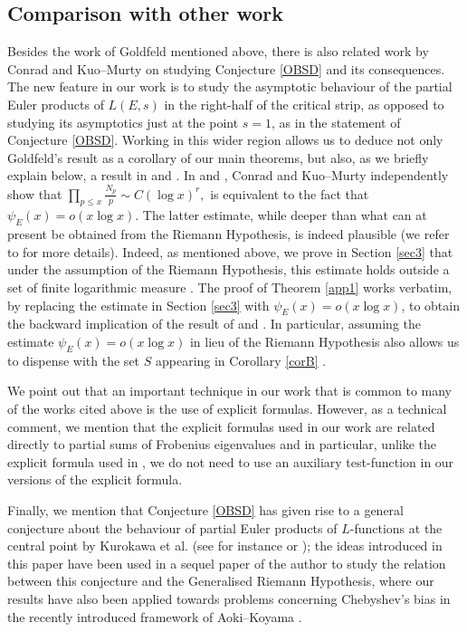 \documentclass[12pt,reqno]{amsart}
\theoremstyle{definition}
\numberwithin{equation}{section}
\begin{document}
\subsection{Comparison with other work} \label{comparison}
Besides the work of Goldfeld \cite{Goldfeld1982} mentioned above, there is also related work by Conrad \cite{Conrad2005} and Kuo--Murty \cite{KuoMurty2005} on studying Conjecture \ref{OBSD} and its consequences. 
The new feature in our work is to study the asymptotic behaviour of the partial Euler products of $L(E, s)$ in the right-half of the critical strip, as opposed to studying its asymptotics just at the point $s=1$, as in the statement of Conjecture \ref{OBSD}. Working in this wider region allows us to deduce not only Goldfeld's result as a corollary of our main theorems, but also, as we briefly explain below, a result in \cite{Conrad2005} and \cite{KuoMurty2005}.  In \cite{Conrad2005} and \cite{KuoMurty2005}, Conrad and Kuo--Murty independently show that $
\prod_{p \leq x} \frac{N_p}{p}  \sim C (\log x)^r, 
$  is equivalent to the fact that $\psi_E(x)=o(x \log x)$. The latter estimate, while deeper than what can at present be obtained from the Riemann Hypothesis, is indeed plausible (we refer to \cite[page 290]{Conrad2005} for more details). 
Indeed, as mentioned above, we prove in Section \ref{sec3} that under the assumption of the Riemann Hypothesis, this estimate holds outside a set of finite logarithmic measure . The proof of Theorem \ref{app1} works verbatim, by replacing the estimate in Section \ref{sec3} with $\psi_E(x)=o(x \log x)$, to obtain the backward implication of the result of \cite{Conrad2005} and \cite{KuoMurty2005}.  In particular, assuming the estimate $\psi_E(x)=o(x \log x)$ in lieu of the Riemann Hypothesis also allows us to dispense with the set $S$ appearing in Corollary \ref{corB} . 

We point out that an important technique in our work that is common to many of the works cited above is the use of explicit formulas. However, as a technical comment, we mention that the explicit formulas used in our work are related directly to partial sums of Frobenius eigenvalues and in particular, unlike the explicit formula used in \cite{Goldfeld1982},  we do not need to use an auxiliary test-function in our versions of the explicit formula. 

Finally, we mention that Conjecture \ref{OBSD} has given rise to a general conjecture about the behaviour of partial Euler products of $L$-functions at the central point by Kurokawa et al. (see for instance \cite{KimuraKoyamaKurokawa2014} or \cite{KanekoKoyamaKurokawa2022}); the ideas introduced in this paper have been used in a sequel paper of the author \cite{Sheth2024} to study the relation between this conjecture and the Generalised Riemann Hypothesis, where our results have also been applied towards problems concerning Chebyshev's bias in the recently introduced framework of Aoki--Koyama  \cite{AokiKoyama2023}. 
\end{document}
